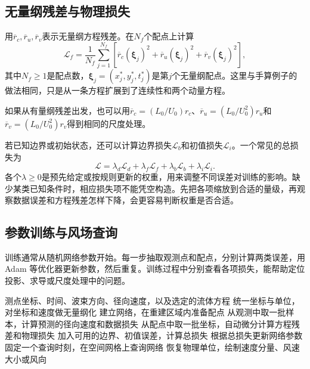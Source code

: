 \subsection{无量纲残差与物理损失}
用$\overline r_c,\overline r_u,\overline r_v$表示无量纲方程残差。在$N_f$个配点上计算
\begin{equation}
 \mathcal L_f=\frac1{N_f}\sum_{j=1}^{N_f}
 \left[\overline r_c(\boldsymbol\xi_j)^2+
 \overline r_u(\boldsymbol\xi_j)^2+
 \overline r_v(\boldsymbol\xi_j)^2\right],
\end{equation}
其中$N_f\geq1$是配点数，$\boldsymbol\xi_j=(x_j^*,y_j^*,t_j^*)$是第$j$个无量纲配点。这里与手算例子的做法相同，只是从一条方程扩展到了连续性和两个动量方程。

如果从有量纲残差出发，也可以用$\overline r_c=(L_0/U_0)r_c$、$\overline r_u=(L_0/U_0^2)r_u$和$\overline r_v=(L_0/U_0^2)r_v$得到相同的尺度处理。

若已知边界或初始状态，还可以计算边界损失$\mathcal L_b$和初值损失$\mathcal L_i$。一个常见的总损失为
\begin{equation}
 \mathcal L=\lambda_d\mathcal L_d+\lambda_f\mathcal L_f
 +\lambda_b\mathcal L_b+\lambda_i\mathcal L_i.
 \label{eq:pinn-loss}
\end{equation}
各个$\lambda\geq0$是预先给定或按规则更新的权重，用来调整不同误差对训练的影响。缺少某类已知条件时，相应损失项不能凭空构造。先把各项缩放到合适的量级，再观察数据误差和方程残差怎样下降，会更容易判断权重是否合适。

\subsection{参数训练与风场查询}
训练通常从随机网络参数开始。每一步抽取观测点和配点，分别计算两类误差，用 Adam 等优化器更新参数，然后重复。训练过程中分别查看各项损失，能帮助定位投影、求导或尺度处理中的问题。

\begin{algorithm}[htbp]
\caption{从稀疏雷达观测训练风场 PINN}
\label{alg:pinn-wind}
\begin{algorithmic}[1]
\Require 测点坐标、时间、波束方向、径向速度，以及选定的流体方程
\State 统一坐标与单位，对坐标和速度做无量纲化
\State 建立网络，在重建区域内准备配点
 \State 从观测中取一批样本，计算预测的径向速度和数据损失
 \State 从配点中取一批坐标，自动微分计算方程残差和物理损失
 \State 加入可用的边界、初值误差，计算总损失
 \State 根据总损失更新网络参数
\EndFor
\State 固定一个查询时刻，在空间网格上查询网络
\State 恢复物理单位，绘制速度分量、风速大小或风向
\end{algorithmic}
\end{algorithm}


